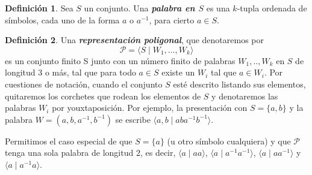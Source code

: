 \documentclass[10pt]{report}
\theoremstyle{definition}
\newtheorem{defin}{Definición}[section]
\begin{document}
\begin{defin}%
Sea $S$ un conjunto. Una \textbf{\textit{palabra en $S$}} es una $k$-tupla ordenada de símbolos, cada uno de la forma $a$ o $a^{-1}$, para cierto $a\in S$.
\end{defin}

\begin{defin}%
\label{def:rep_pol}
Una \textbf{\textit{representación poligonal}}, que denotaremos por $$\mathcal{P}=\langle S\mid W_1,\dots ,W_k\rangle$$ es un conjunto finito S junto con un número finito de palabras $W_1,..,W_k$ en $S$ de longitud $3$ o más, tal que para todo $a\in S$ existe un $W_i$ tal que $a\in W_i$. Por cuestiones de notación, cuando el conjunto $S$ esté descrito listando sus elementos, quitaremos los corchetes que rodean los elementos de $S$ y denotaremos las palabras $W_i$ por youxtaposición. Por ejemplo, la presentación con $S=\{a,b\}$ y la palabra $W=(a,b,a^{-1},b^{-1})$ se escribe $\langle a,b\mid  aba^{-1}b^{-1}\rangle$. 

Permitimos el caso especial de que $S=\{a\}$ (u otro símbolo cualquiera) y que $\mathcal{P}$ tenga una sola palabra de longitud $2$, es decir, $\langle a\mid aa\rangle$, $\langle a\mid a^{-1}a^{-1}\rangle$, $\langle a\mid aa^{-1}\rangle$ y $\langle a\mid a^{-1}a\rangle$.

\end{defin}
\end{document}
